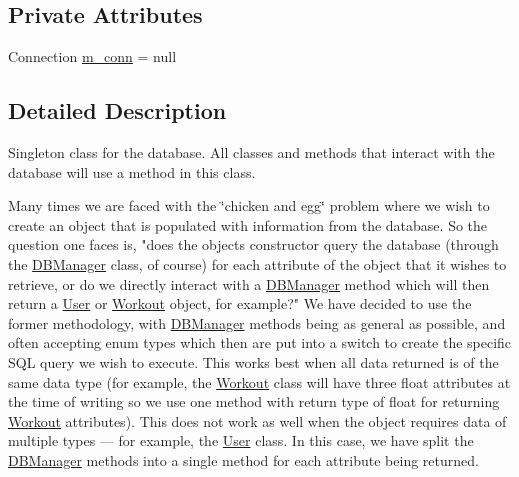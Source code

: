 \subsection*{Private Attributes}
\begin{DoxyCompactItemize}
\item 
Connection \mbox{\hyperlink{classcom_1_1activitytracker_1_1_d_b_manager_a064088d13ac09eb147fdc19268771521}{m\+\_\+conn}} = null
\end{DoxyCompactItemize}


\subsection{Detailed Description}
Singleton class for the database. All classes and methods that interact with the database will use a method in this class.

Many times we are faced with the \char`\"{}chicken and egg\char`\"{} problem where we wish to create an object that is populated with information from the database. So the question one faces is, "does the object\textquotesingle{}s constructor query the database (through the \mbox{\hyperlink{classcom_1_1activitytracker_1_1_d_b_manager}{D\+B\+Manager}} class, of course) for each attribute of the object that it wishes to retrieve, or do we directly interact with a \mbox{\hyperlink{classcom_1_1activitytracker_1_1_d_b_manager}{D\+B\+Manager}} method which will then return a \mbox{\hyperlink{classcom_1_1activitytracker_1_1_user}{User}} or \mbox{\hyperlink{classcom_1_1activitytracker_1_1_workout}{Workout}} object, for example?" We have decided to use the former methodology, with \mbox{\hyperlink{classcom_1_1activitytracker_1_1_d_b_manager}{D\+B\+Manager}} methods being as general as possible, and often accepting enum types which then are put into a switch to create the specific S\+QL query we wish to execute. This works best when all data returned is of the same data type (for example, the \mbox{\hyperlink{classcom_1_1activitytracker_1_1_workout}{Workout}} class will have three float attributes at the time of writing so we use one method with return type of float for returning \mbox{\hyperlink{classcom_1_1activitytracker_1_1_workout}{Workout}} attributes). This does not work as well when the object requires data of multiple types --- for example, the \mbox{\hyperlink{classcom_1_1activitytracker_1_1_user}{User}} class. In this case, we have split the \mbox{\hyperlink{classcom_1_1activitytracker_1_1_d_b_manager}{D\+B\+Manager}} methods into a single method for each attribute being returned.

